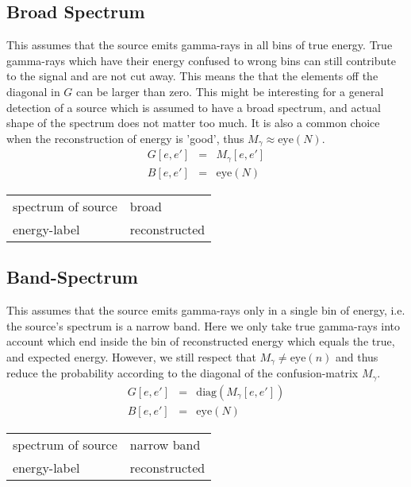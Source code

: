 \documentclass{article}%
\begin{document}
\subsection{Broad Spectrum}
%
This assumes that the source emits gamma-rays in all bins of true energy.
%
True gamma-rays which have their energy confused to wrong bins can still contribute to the signal and are not cut away.
%
This means the that the elements off the diagonal in $G$ can be larger than zero.
%
This might be interesting for a general detection of a source which is assumed to have a broad spectrum, and actual shape of the spectrum does not matter too much.
%
It is also a common choice when the reconstruction of energy is 'good', thus $M_\gamma \approx \mathrm{eye}(N)$.
%
\begin{eqnarray}
G[e, e'] &=& M_{\gamma}[e, e']
\\
B[e, e'] &=& \mathrm{eye}(N)
\end{eqnarray}
%
\begin{center}
\begin{tabular}{ll}
spectrum of source & broad\\
energy-label & reconstructed\\
\end{tabular}
\end{center}
%
\subsection{Band-Spectrum}
%
This assumes that the source emits gamma-rays only in a single bin of energy, i.e. the source's spectrum is a narrow band.
%
Here we only take true gamma-rays into account which end inside the bin of reconstructed energy which equals the true, and expected energy.
%
However, we still respect that $M_{\gamma} \neq \mathrm{eye}(n)$ and thus reduce the probability according to the diagonal of the confusion-matrix $M_{\gamma}$.
%
\begin{eqnarray}
G[e, e'] &=& \mathrm{diag}(M_{\gamma}[e, e'])
\\
B[e, e'] &=& \mathrm{eye}(N)
\end{eqnarray}
%
\begin{center}
\begin{tabular}{ll}
spectrum of source & narrow band\\
energy-label & reconstructed\\
\end{tabular}
\end{center}
%
\end{document}
